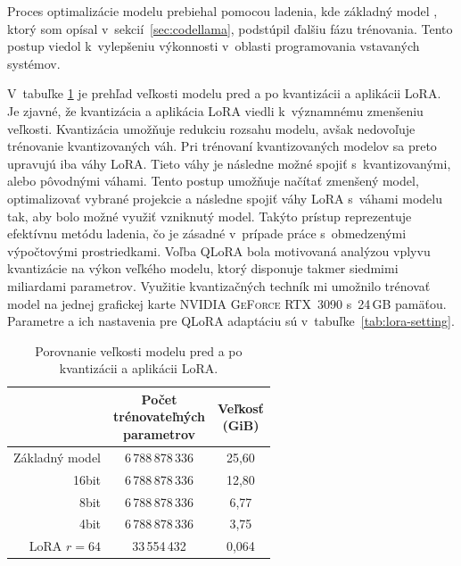 Proces optimalizácie modelu \MC{} prebiehal pomocou ladenia, kde základný model \CL{}, ktorý som opísal v~sekcií~\ref{sec:codellama}, podstúpil ďalšiu fázu trénovania. Tento postup viedol k~vylepšeniu výkonnosti v~oblasti programovania vstavaných systémov.

V~tabuľke \ref{tab:model_size} je prehľad veľkosti modelu pred a po kvantizácii a aplikácii LoRA. Je zjavné, že kvantizácia a aplikácia LoRA viedli k~významnému zmenšeniu veľkosti. Kvantizácia umožňuje redukciu rozsahu modelu, avšak nedovoľuje trénovanie kvantizovaných váh. Pri trénovaní kvantizovaných modelov sa preto upravujú iba váhy LoRA. Tieto váhy je následne možné spojiť s~kvantizovanými, alebo pôvodnými váhami. Tento postup umožňuje načítať zmenšený model, optimalizovať vybrané projekcie a následne spojiť váhy LoRA s~váhami modelu tak, aby bolo možné využiť vzniknutý model. Takýto prístup reprezentuje efektívnu metódu ladenia, čo je zásadné v~prípade práce s~obmedzenými výpočtovými prostriedkami. Voľba QLoRA bola motivovaná analýzou vplyvu kvantizácie na výkon veľkého modelu, ktorý disponuje takmer siedmimi miliardami parametrov. Využitie kvantizačných techník mi umožnilo trénovať model na jednej grafickej karte \textsc{NVIDIA GeForce RTX~3090} s~24\,GB pamäťou. Parametre a ich nastavenia pre QLoRA adaptáciu sú v~tabuľke~\ref{tab:lora-setting}.

\begin{table}[!ht]
    \centering
    \begin{tabular}{r|c|c}
        &  \makecell{Počet \\ trénovateľných \\ parametrov} & \makecell{Veľkosť \\ (GiB)} \\
        \hline
        Základný model  & 6\,788\,878\,336      & 25,60 \\
        16bit           & 6\,788\,878\,336      & 12,80 \\
        8bit            & 6\,788\,878\,336      & 6,77 \\
        4bit            & 6\,788\,878\,336      & 3,75 \\
        LoRA $r=64$       & 33\,554\,432          & 0,064 \\
    \end{tabular}
    \caption{Porovnanie veľkosti modelu \MC{} pred a po kvantizácii a aplikácii LoRA.}
    \label{tab:model_size}
\end{table}

